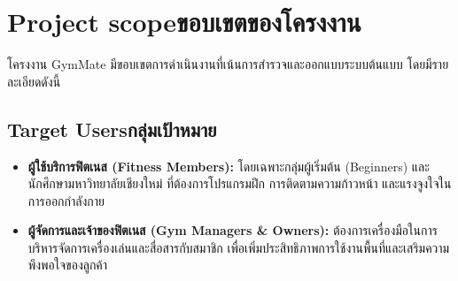 \section{\ifenglish Project scope\else ขอบเขตของโครงงาน\fi}
\enskip โครงงาน GymMate มีขอบเขตการดำเนินงานที่เน้นการสำรวจและออกแบบระบบต้นแบบ โดยมีรายละเอียดดังนี้

\subsection{\ifenglish Target Users\else กลุ่มเป้าหมาย\fi}
\begin{itemize}
    \item \textbf{ผู้ใช้บริการฟิตเนส (Fitness Members):}
    โดยเฉพาะกลุ่มผู้เริ่มต้น (Beginners) และนักศึกษามหาวิทยาลัยเชียงใหม่ ที่ต้องการโปรแกรมฝึก การติดตามความก้าวหน้า และแรงจูงใจในการออกกำลังกาย
    \item \textbf{ผู้จัดการและเจ้าของฟิตเนส (Gym Managers \& Owners):}
    ต้องการเครื่องมือในการบริหารจัดการเครื่องเล่นและสื่อสารกับสมาชิก เพื่อเพิ่มประสิทธิภาพการใช้งานพื้นที่และเสริมความพึงพอใจของลูกค้า
\end{itemize}


